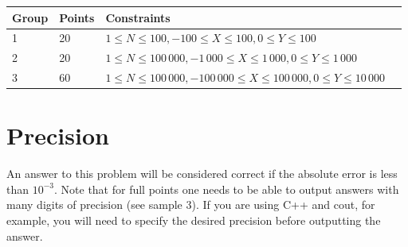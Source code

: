 \begin{tabular}{| l | l | l | l |}
\hline
Group & Points & Constraints \\ \hline
1     & 20         &  $1 \le N \le 100, -100 \le X \le 100, 0 \le Y \le 100$ \\ \hline
2     & 20         &  $1 \le N \le 100\,000, -1\,000 \le X \le 1\,000, 0 \le Y \le 1\,000$ \\ \hline
3     & 60         &  $1 \le N\le 100\,000, -100\,000 \le X \le 100\,000, 0 \le Y \le 10\,000$\\ \hline
\end{tabular}

\section*{Precision}
An answer to this problem will be considered correct if the absolute error is less than $10^{-3}$. Note that for full points one needs to be able to output answers with many digits of precision (see sample 3). If you are using C++ and cout, for example, you will need to specify the desired precision before outputting the answer.

